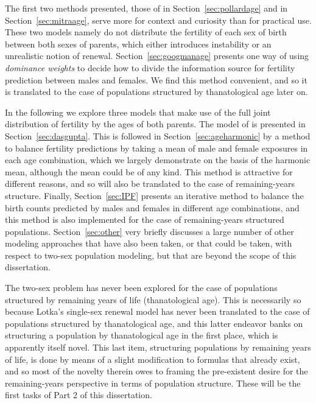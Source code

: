 The first two methods presented, those of \citet{pollard1948measurement} in
Section~\ref{sec:pollardage} and
\citet{mitra1978derivation} in Section~\ref{sec:mitraage}, serve more for context and curiosity than for
practical use. These two models namely do not distribute the fertility of each
sex of birth between both sexes of parents, which either introduces instability
or an unrealistic notion of renewal. Section~\ref{sec:googmanage} presents one
way of using \textit{dominance weights} to decide how to divide the information source 
for fertility prediction between males and females. We find this method
convenient, and so it is translated to the case of populations structured by
thanatological age later on. 

In the following we explore three models that make use of the full joint
distribution of fertility by the ages of both parents. The model of
\citet{gupta1978alternative} is presented in Section~\ref{sec:dasgupta}. This is
followed in Section~\ref{sec:ageharmonic} by a method to balance fertility
predictions by taking a mean of male and female exposures in each age combination, 
which we largely demonstrate on the
basis of the harmonic mean, although the mean could be of any kind. This method
is attractive for different reasons, and so will also be translated to the case
of remaining-years structure. Finally, Section~\ref{sec:IPF} presents an
iterative method to balance the birth counts predicted by males and females in
different age combinations, and this method is also implemented for the case of
remaining-years structured populations. Section~\ref{sec:other} very briefly
discusses a large number of other modeling approaches that have also been
taken, or that could be taken, with respect to two-sex population modeling, but
that are beyond the scope of this dissertation.

The two-sex problem has never been explored for the case of populations
structured by remaining years of life (thanatological age). This is necessarily 
so because Lotka's single-sex renewal model \citep{sharpe1911problem} has never
been translated to the case of populations structured by thanatological age, 
and this latter endeavor banks on structuring a population by 
thanatological age in the first place, which is apparently itself novel. This
last item, structuring populations by remaining years of life, is done by means
of a slight modification to formulas that already exist, and so most of the
novelty therein owes to framing the pre-existent desire for the remaining-years perspective in
terms of population structure. These will be the first tasks of Part 2
of this dissertation.

